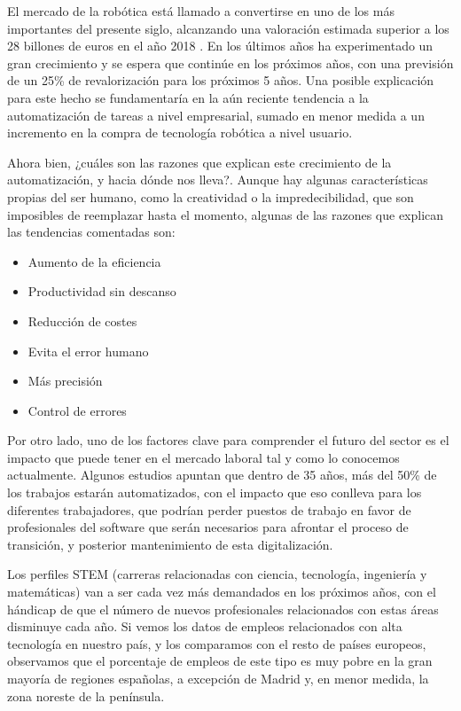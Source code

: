 \documentclass[12pt,spanish,chapterprefix, numbers=noenddot]{book}
\numberwithin{equation}{section}
\numberwithin{figure}{section}
\begin{document}
El mercado de la robótica está llamado a convertirse en uno de los más importantes del presente siglo, alcanzando una valoración estimada superior a los 28 billones de euros en el año 2018 \cite{robotics_market}. En los últimos años ha experimentado un gran crecimiento y se espera que continúe en los próximos años, con una previsión de un 25\% de revalorización para los próximos 5 años. 
Una posible explicación para este hecho se fundamentaría en la aún reciente tendencia a la automatización de tareas a nivel empresarial, sumado en menor medida a un incremento en la compra de tecnología robótica a nivel usuario.

Ahora bien, ¿cuáles son las razones que explican este crecimiento de la automatización, y hacia dónde nos lleva?. Aunque hay algunas características propias del ser humano, como la creatividad o la impredecibilidad, que son imposibles de reemplazar hasta el momento, algunas de las razones que explican las tendencias comentadas son:
\begin{itemize}
\item Aumento de la eficiencia 
\item Productividad sin descanso
\item Reducción de costes
\item Evita el error humano
\item Más precisión
\item Control de errores
\end{itemize}
Por otro lado, uno de los factores clave para comprender el futuro del sector es el impacto que puede tener en el mercado laboral tal y como lo conocemos actualmente. Algunos estudios \cite{automation_forecast} \cite{mckinsey_automation} apuntan que dentro de 35 años, más del 50\% de los trabajos estarán automatizados, con el impacto que eso conlleva para los diferentes trabajadores, que podrían perder puestos de trabajo en favor de profesionales del software que serán necesarios para afrontar el proceso de transición, y posterior mantenimiento de esta digitalización. 

Los perfiles STEM (carreras relacionadas con ciencia, tecnología, ingeniería y matemáticas) van a ser cada vez más demandados en los próximos años, con el hándicap de que el número de nuevos profesionales relacionados con estas áreas disminuye cada año. 
Si vemos los datos de empleos relacionados con alta tecnología en nuestro país, y los comparamos con el resto de países europeos, observamos que el porcentaje de empleos de este tipo es muy pobre en la gran mayoría de regiones españolas, a excepción de Madrid y, en menor medida, la zona noreste de la península. 
\end{document}
